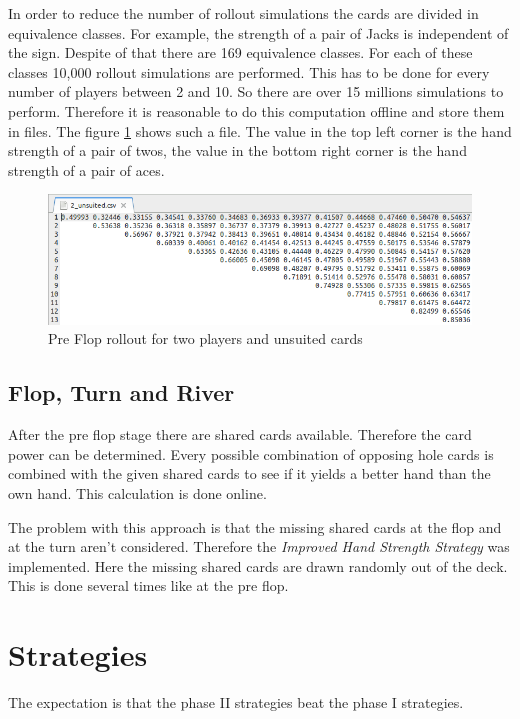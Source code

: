 In order to reduce the number of rollout simulations the cards are divided in equivalence classes. For example, the strength of a pair of Jacks is independent of the sign. Despite of that there are 169 equivalence classes. For each of these classes 10,000 rollout simulations are performed. This has to be done for every number of players between 2 and 10. So there are over 15 millions simulations to perform. Therefore it is reasonable to do this computation offline and store them in files. The figure \ref{fig:preflop} shows such a file. The value in the top left corner is the hand strength of a pair of twos, the value in the bottom right corner is the hand strength of a pair of aces.

\begin{figure}[h]
  \centering
  \includegraphics[width=1.0\textwidth]{images/preflop}
  \caption{Pre Flop rollout for two players and unsuited cards}
  \label{fig:preflop}
\end{figure}

\subsection{Flop, Turn and River}
After the pre flop stage there are shared cards available. Therefore the card power can be determined. Every possible combination of opposing hole cards is combined with the given shared cards to see if it yields a better hand than the own hand. This calculation is done online.

The problem with this approach is that the missing shared cards at the flop and at the turn aren't considered. Therefore the \emph{Improved Hand Strength Strategy} was implemented. Here the missing shared cards are drawn randomly out of the deck. This is done several times like at the pre flop.

\section{Strategies}
The expectation is that the phase II strategies beat the phase I strategies.


